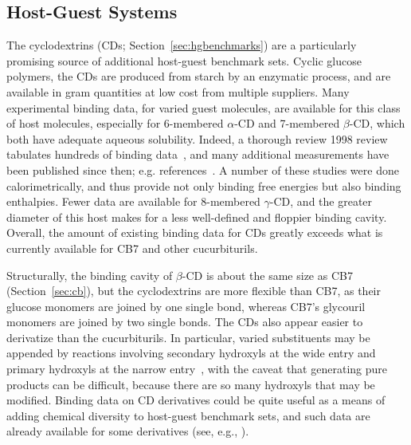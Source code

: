 \documentclass[aps,pre,twocolumn,nofootinbib,superscriptaddress,10pt, final,tightenlines]{revtex4-1}
\begin{document}
\subsection{Host-Guest Systems}
The cyclodextrins (CDs; Section~\ref{sec:hgbenchmarks}) are a particularly promising source of additional host-guest benchmark sets.
Cyclic glucose polymers, the CDs are produced from starch by an enzymatic process, and are available in gram quantities at low cost from multiple suppliers. 
Many experimental binding data, for varied guest molecules, are available for this class of host molecules, especially for 6-membered $\alpha$-CD and 7-membered $\beta$-CD, which both have adequate aqueous solubility.
Indeed, a thorough review 1998 review tabulates hundreds of binding data~\cite{rekharsky_complexation_1998}, and many additional measurements have been published since then; e.g. references~\cite{Connors:1997:Chem.Rev., Carrazana:2005:J.Phys.Chem.B, Cotner:1998:J.Org.Chem., Wszelaka-Rylik:2013:JThermAnalCalorim,  Shu:2007:BritishJournalofPharmacology, Rodriguez-Perez:2006:J.Pharm.Sci., Mic:2013:AIPConferenceProceedings}.
A number of these studies were done calorimetrically, and thus provide not only binding free energies but also binding enthalpies. 
Fewer data are available for 8-membered $\gamma$-CD, and the greater diameter of this host makes for a less well-defined and floppier binding cavity.
Overall, the amount of existing binding data for CDs greatly exceeds what is currently available for CB7 and other cucurbiturils.

Structurally, the binding cavity of $\beta$-CD is about the same size as CB7 (Section~\ref{sec:cb}), but the cyclodextrins are more flexible than CB7, as their glucose monomers are joined by one single bond, whereas CB7's glycouril monomers are joined by two single bonds.
The CDs also appear easier to derivatize than the cucurbiturils. In particular, varied substituents may be appended by reactions involving secondary hydroxyls at the wide entry and primary hydroxyls at the narrow entry~\cite{Fromming:1994:CyclodextrinsinPharmacy, Dodziuk:2006:, Szente:1999:AdvancedDrugDeliveryReviews, Qu:2002:JournalofInclusionPhenomena, Jindrich:2005:J.Org.Chem.}, with the caveat that generating pure products can be difficult, because there are so many hydroxyls that may be modified. 
Binding data on CD derivatives could be quite useful as a means of adding chemical diversity to host-guest benchmark sets, and such data are already available for some derivatives (see, e.g., \cite{rekharsky_complexation_1998, Faugeras:2012:Eur.J.Org.Chem.}).
\end{document}

